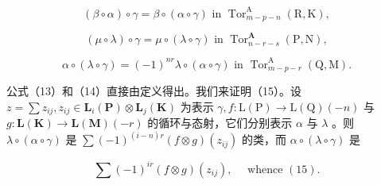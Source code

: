 \[
(\beta \circ \alpha) \circ \gamma = \beta \circ (\alpha \circ \gamma) \text { in }\operatorname{Tor} _ {m - p - n} ^ {\mathrm{A}} (\mathrm{R}, \mathrm{K}),\tag{14}
\]

\[
(\mu \circ \lambda) \circ \gamma = \mu \circ (\lambda \circ \gamma) \text { in }\operatorname{Tor} _ {n - r - s} ^ {\mathbf {A}} (\mathrm{P}, \mathrm{N}),\tag{15}
\]

\[
\alpha \circ (\lambda \circ \gamma) = (- 1) ^ {n r} \lambda \circ (\alpha \circ \gamma) \text { in }\operatorname{Tor} _ {m - p - r} ^ {\mathrm{A}} (\mathrm{Q}, \mathrm{M}).
\]

公式（13）和（14）直接由定义得出。我们来证明（15）。设 \(z = \sum z_{ij}, z_{ij} \in \mathbf{L}_i(\mathbf{P}) \otimes \mathbf{L}_j(\mathbf{K})\) 为表示 \(\gamma, f: \mathrm{L}(\mathrm{P}) \to \mathrm{L}(\mathrm{Q})(-n)\) 与 \(g: \mathbf{L}(\mathbf{K}) \to \mathbf{L}(\mathbf{M})(-r)\) 的循环与态射，它们分别表示 \(\alpha\) 与 \(\lambda\) 。则 \(\lambda \circ (\alpha \circ \gamma)\) 是 \(\sum (-1)^{(i-n)r}(f \otimes g)(z_{ij})\) 的类，而 \(\alpha \circ (\lambda \circ \gamma)\) 是

\[
\sum (- 1) ^ {i r} (f \otimes g) (z _ {i j}), \quad \text { whence } (1 5).
\]

